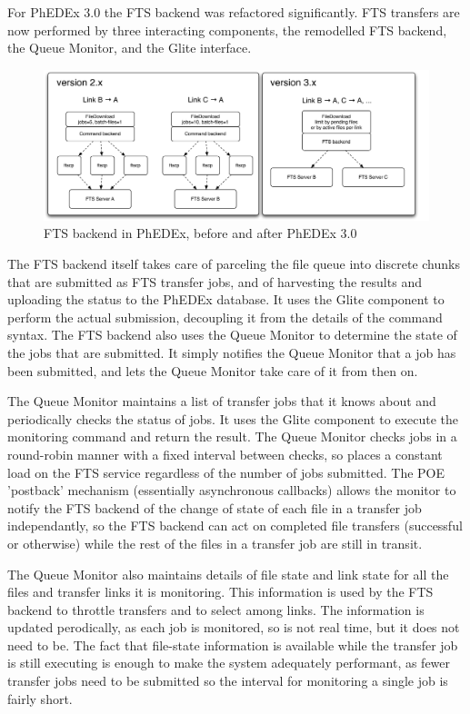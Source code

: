 \documentclass{PoS}
\begin{document}
For PhEDEx 3.0 the FTS backend was refactored significantly. FTS
transfers are now performed by three interacting components, the
remodelled FTS backend, the Queue Monitor, and the Glite interface.

\begin{figure}[htp] 
\centering
\includegraphics[width=.8\textwidth]{fts-combined.pdf}
\caption{FTS backend in PhEDEx, before and after PhEDEx 3.0}
\label{fig:fts}
\end{figure} 

The FTS backend itself takes care of parceling the file queue into
discrete chunks that are submitted as FTS transfer jobs, and of
harvesting the results and uploading the status to the PhEDEx
database. It uses the Glite component to perform the actual
submission, decoupling it from the details of the command syntax. The
FTS backend also uses the Queue Monitor to determine the state of the
jobs that are submitted. It simply notifies the Queue Monitor that a
job has been submitted, and lets the Queue Monitor take care of it
from then on.

The Queue Monitor maintains a list of transfer jobs that it knows
about and periodically checks the status of jobs. It uses the Glite
component to execute the monitoring command and return the result. The
Queue Monitor checks jobs in a round-robin manner with a fixed
interval between checks, so places a constant load on the FTS service
regardless of the number of jobs submitted. The POE 'postback'
mechanism (essentially asynchronous callbacks) allows the monitor to
notify the FTS backend of the change of state of each file in a
transfer job independantly, so the FTS backend can act on completed
file transfers (successful or otherwise) while the rest of the files
in a transfer job are still in transit.

The Queue Monitor also maintains details of file state and link state
for all the files and transfer links it is monitoring. This
information is used by the FTS backend to throttle transfers and to
select among links. The information is updated perodically, as each
job is monitored, so is not real time, but it does not need to be. The
fact that file-state information is available while the transfer job
is still executing is enough to make the system adequately performant,
as fewer transfer jobs need to be submitted so the interval for
monitoring a single job is fairly short.
\end{document}
